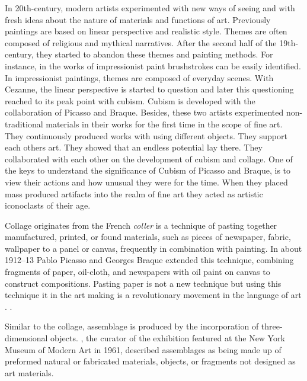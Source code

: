In 20th-century, modern artists experimented with new ways of seeing and with fresh ideas about the nature of materials and functions of art. Previously paintings are based on linear perspective and realistic style. Themes are often composed of religious and mythical narratives. After the second half of the 19th-century, they started to abandon these themes and painting methods. For instance, in the works of impressionist paint brushstrokes can be easily identified. In impressionist paintings, themes are composed of everyday scenes. With Cezanne, the linear perspective is started to question and later this questioning reached to its peak point with cubism. Cubism is developed with the collaboration of Picasso and Braque. Besides, these two artists experimented non-traditional materials in their works for the first time in the scope of fine art. They continuously produced works with using different objects. They support each others art. They showed that an endless potential lay there. They collaborated with each other on the development of cubism and collage. One of the keys to understand the significance of Cubism of Picasso and Braque, is to view their actions and how unusual they were for the time. When they placed mass produced artifacts into the realm of fine art they acted as artistic iconoclasts of their age.

Collage originates from the French \textit{coller} is a technique of pasting together manufactured, printed, or found materials, such as pieces of newspaper, fabric, wallpaper to a panel or canvas, frequently in combination with painting. In about 1912–13 Pablo Picasso and Georges Braque extended this technique, combining fragments of paper, oil-cloth, and newspapers with oil paint on canvas to construct compositions. Pasting paper is not a new technique but using this technique it in the art making is a revolutionary movement in the language of art \citep{waldman1992collage}.  \citep{greenberg1984collage}.

Similar to the collage, assemblage is produced by the incorporation of three-dimensional objects. \cite{seitz1961art}, the curator of the exhibition  featured at the New York Museum of Modern Art in 1961, described assemblages as being made up of preformed natural or fabricated materials, objects, or fragments not designed as art materials.

